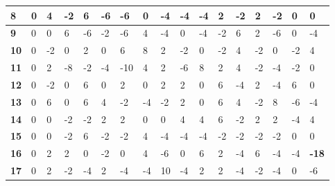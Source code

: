 \begin{longtable}[c]{|l|l|l|l|l|l|l|l|l|l|l|l|l|l|l|l|l|}
\textbf{8}  & 0          & 4          & -2         & 6          & -6         & -6         & 0          & -4         & -4         & -4         & 2           & -2          & 2           & -2          & 0           & 0            \\ \hline
\textbf{9}  & 0          & 0          & 6          & -6         & -2         & -6         & 4          & -4         & 0          & -4         & -2          & 6           & 2           & -6          & 0           & -4           \\ \hline
\textbf{10} & 0          & -2         & 0          & 2          & 0          & 6          & 8          & 2          & -2         & 0          & -2          & 4           & -2          & 0           & -2          & 4            \\ \hline
\textbf{11} & 0          & 2          & -8         & -2         & -4         & -10        & 4          & 2          & -6         & 8          & 2           & 4           & -2          & -4          & -2          & 0            \\ \hline
\textbf{12} & 0          & -2         & 0          & 6          & 0          & 2          & 0          & 2          & 2          & 0          & 6           & -4          & 2           & -4          & 6           & 0            \\ \hline
\textbf{13} & 0          & 6          & 0          & 6          & 4          & -2         & -4         & -2         & 2          & 0          & 6           & 4           & -2          & 8           & -6          & -4           \\ \hline
\textbf{14} & 0          & 0          & -2         & -2         & 2          & 2          & 0          & 0          & 4          & 4          & 6           & -2          & 2           & 2           & -4          & 4            \\ \hline
\textbf{15} & 0          & 0          & -2         & 6          & -2         & -2         & 4          & -4         & -4         & -4         & -2          & -2          & -2          & -2          & 0           & 0            \\ \hline
\textbf{16} & 0          & 2          & 2          & 0          & -2         & 0          & 4          & -6         & 0          & 6          & 2           & -4          & 6           & -4          & -4          & \textbf{-18} \\ \hline
\textbf{17} & 0          & 2          & -2         & -4         & 2          & -4         & -4         & 10         & -4         & 2          & 2           & -4          & -2          & -4          & 0           & -6           \\ \hline

\end{longtable}
